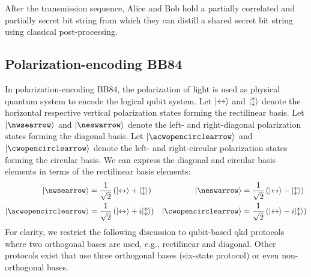 After the transmission sequence, Alice and Bob hold a partially correlated and partially secret bit string from which they can distill a shared secret bit string using classical post-processing.

\FloatBarrier
\subsection{Polarization-encoding BB84}

In polarization-encoding BB84, the polarization of light is used as physical quantum system to encode the logical qubit system.
Let $\lvert\leftrightarrow\rangle$ and $\lvert\updownarrow\rangle$ denote the horizontal respective vertical polarization states forming the rectilinear basis.
Let $\ket{\nwsearrow}$ and $\ket{\neswarrow}$ denote the left- and right-diagonal polarization states forming the diagonal basis.
Let $\ket{\acwopencirclearrow}$ and $\ket{\cwopencirclearrow}$ denote the left- and right-circular polarization states forming the circular basis.
We can express the diagonal and circular basis elements in terms of the rectilinear basis elements:
\begin{align}
	\ket{\nwsearrow}
	&=
	\frac{1}{\sqrt{2}}
	\left(
		\ket{\leftrightarrow}
		+
		\ket{\updownarrow}
	\right)
	&
	\ket{\neswarrow}
	&=
	\frac{1}{\sqrt{2}}
	\left(
		\ket{\leftrightarrow}
		-
		\ket{\updownarrow}
	\right)
	\\
	\ket{\acwopencirclearrow}
	&=
	\frac{1}{\sqrt{2}}
	\left(
		\ket{\leftrightarrow}
		+
		i\ket{\updownarrow}
	\right)
	&
	\ket{\cwopencirclearrow}
	&=
	\frac{1}{\sqrt{2}}
	\left(
		\ket{\leftrightarrow}
		-
		i\ket{\updownarrow}
	\right)
\end{align}
For clarity, we restrict the following discussion to qubit-based \gls{qkd} protocols where two orthogonal bases are used, e.g., rectilinear and diagonal.
Other protocols exist that use three orthogonal bases (six-state protocol) or even non-orthogonal bases.

